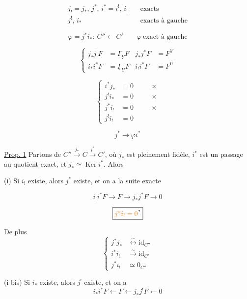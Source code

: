 \[
\begin{aligned}
j_!=j_*,\,j^*,\,i^*=i^!,\,i_!&\quad\text{exacts}\\
j^!,\,i_*&\quad\text{exacts à gauche}
\end{aligned}
\]

\[
\varphi=j^*i_*:\ C''\longleftarrow C'\qquad\varphi\ \text{exact à gauche}
\]

\[
\left\{\begin{aligned}
j_*j^!F&=\underline{\Gamma}_Y F& j_*j^*F&=F^Y\\
i_*i^*F&=\underline{\Gamma}_U F& i_!i^*F&=F^U
\end{aligned}\right.
\]

\[
\left\{\begin{aligned}
i^*j_*&=0&\quad &\times\\
j^!i_*&=0&&\times\\
j^*i_!&=0&&\times\\
j^!i_!&=0
\end{aligned}\right.
\]

\[
j^*\longrightarrow\varphi i^*
\]

\uline{Prop. 1} Partons de $C''\xrightarrow{j_*}C\xrightarrow{i^*}C'$, où $j_*$ est pleinement fidèle, $i^*$ est un passage au quotient exact, et $j_*\simeq\operatorname{Ker}i^*$.  Alors

(i) Si $i_!$ existe, alors $j^*$ existe, et on a la suite exacte


\[
\boxed{i_!i^*F\longrightarrow F\longrightarrow j_*j^*F\longrightarrow 0}
\]

\[
\boxed{\deleted{\unsure{j^*i_!=0}}}
\]

De plus
\[
\left\{\begin{aligned}
j^*j_*&\overset{\sim}{\longleftrightarrow}\mathrm{id}_{C''}\\
i^*i_!&\xrightarrow{\sim}\mathrm{id}_{C'}\\
j^*i_!&\simeq 0_{C''}
\end{aligned}\right.
\]

(i bis) Si $i_*$ existe, alors $j^!$ existe, et on a
\[
i_*i^*F\longleftarrow F\longleftarrow j_*j^!F\longleftarrow 0
\]

